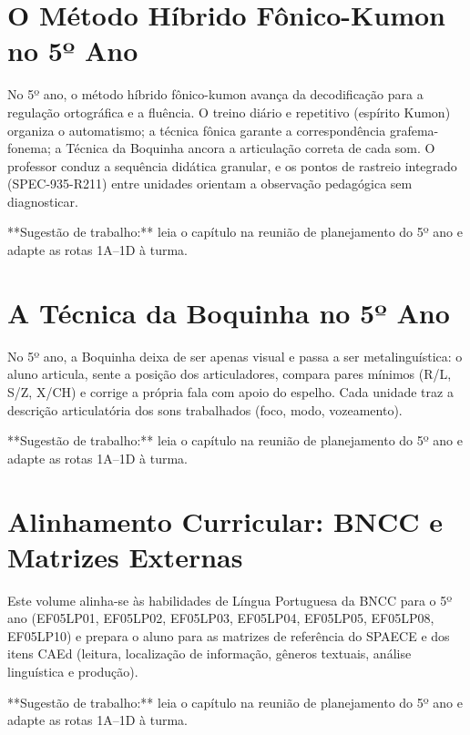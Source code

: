 
\chapter{O Método Híbrido Fônico-Kumon no 5º Ano}

No 5º ano, o método híbrido fônico-kumon avança da decodificação para a regulação ortográfica e a fluência. O treino diário e repetitivo (espírito Kumon) organiza o automatismo; a técnica fônica garante a correspondência grafema-fonema; a Técnica da Boquinha ancora a articulação correta de cada som. O professor conduz a sequência didática granular, e os pontos de rastreio integrado (SPEC-935-R211) entre unidades orientam a observação pedagógica sem diagnosticar.


\begin{dica}
**Sugestão de trabalho:** leia o capítulo na reunião de planejamento do 5º ano e adapte as rotas 1A–1D à turma.
\end{dica}

\chapter{A Técnica da Boquinha no 5º Ano}

No 5º ano, a Boquinha deixa de ser apenas visual e passa a ser metalinguística: o aluno articula, sente a posição dos articuladores, compara pares mínimos (R/L, S/Z, X/CH) e corrige a própria fala com apoio do espelho. Cada unidade traz a descrição articulatória dos sons trabalhados (foco, modo, vozeamento).


\begin{dica}
**Sugestão de trabalho:** leia o capítulo na reunião de planejamento do 5º ano e adapte as rotas 1A–1D à turma.
\end{dica}

\chapter{Alinhamento Curricular: BNCC e Matrizes Externas}

Este volume alinha-se às habilidades de Língua Portuguesa da BNCC para o 5º ano (EF05LP01, EF05LP02, EF05LP03, EF05LP04, EF05LP05, EF05LP08, EF05LP10) e prepara o aluno para as matrizes de referência do SPAECE e dos itens CAEd (leitura, localização de informação, gêneros textuais, análise linguística e produção).


\begin{dica}
**Sugestão de trabalho:** leia o capítulo na reunião de planejamento do 5º ano e adapte as rotas 1A–1D à turma.
\end{dica}

